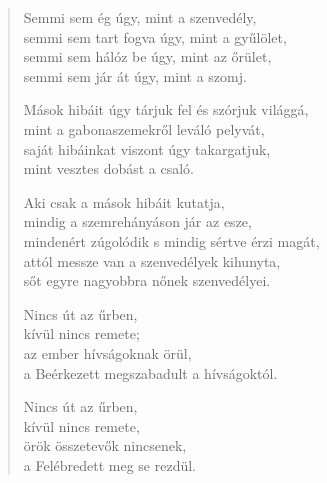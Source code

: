 \begin{verse}
 Semmi sem ég úgy, mint a szenvedély,\\
semmi sem tart fogva úgy, mint a gyűlölet,\\
semmi sem hálóz be úgy, mint az őrület,\\
semmi sem jár át úgy, mint a szomj.

 Mások hibáit úgy tárjuk fel és szórjuk világgá,\\
mint a gabonaszemekről leváló pelyvát,\\
saját hibáinkat viszont úgy takargatjuk,\\
mint vesztes dobást a csaló.

 Aki csak a mások hibáit kutatja,\\
mindig a szemrehányáson jár az esze,\\
mindenért zúgolódik s mindig sértve érzi magát,\\
attól messze van a szenvedélyek kihunyta,\\
sőt egyre nagyobbra nőnek szenvedélyei.

 Nincs út az űrben,\\
kívül nincs remete;\\
az ember hívságoknak örül,\\
a Beérkezett megszabadult a hívságoktól.

 Nincs út az űrben,\\
kívül nincs remete,\\
örök összetevők nincsenek,\\
a Felébredett meg se rezdül.

\end{verse}

